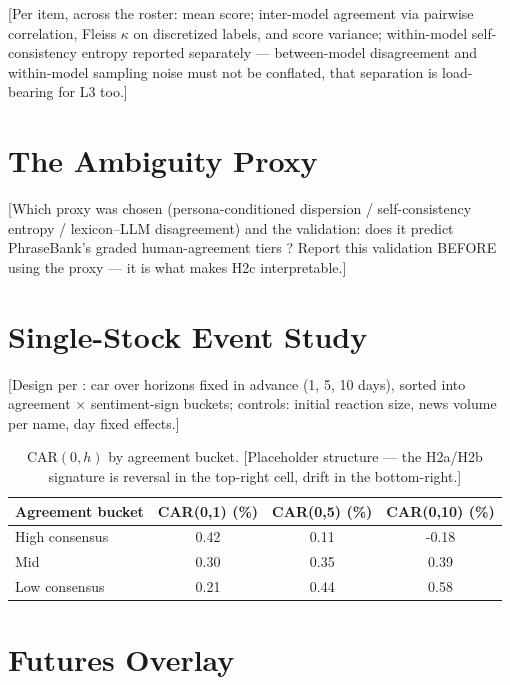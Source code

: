 [Per item, across the roster: mean score; inter-model agreement via
pairwise correlation, Fleiss $\kappa$ \parencite{fleiss1971kappa} on
discretized labels, and score variance; within-model self-consistency
entropy reported separately --- between-model disagreement and
within-model sampling noise must not be conflated, that separation is
load-bearing for L3 too.]

\section{The Ambiguity Proxy}
\label{sec:l2-ambiguity}

[Which proxy was chosen (persona-conditioned dispersion /
self-consistency entropy / lexicon--LLM disagreement) and the
validation: does it predict PhraseBank's graded human-agreement tiers
\parencite{malo2014phrasebank}? Report this validation BEFORE using
the proxy --- it is what makes H2c interpretable.]

\section{Single-Stock Event Study}
\label{sec:l2-event-study}

[Design per \textcite{mackinlay1997event}: \gls{car} over horizons
fixed in advance (1, 5, 10 days), sorted into agreement $\times$
sentiment-sign buckets; controls: initial reaction size, news volume
per name, day fixed effects.]

\begin{table}[htbp]
  \centering
  \caption{CAR$(0,h)$ by agreement bucket. [Placeholder structure ---
  the H2a/H2b signature is reversal in the top-right cell, drift in
  the bottom-right.]}
  \label{tab:l2-car}
  \begin{tabular}{@{}l S[table-format=-1.2] S[table-format=-1.2] S[table-format=-1.2]@{}}
    \toprule
    Agreement bucket & {CAR(0,1) (\%)} & {CAR(0,5) (\%)} & {CAR(0,10) (\%)} \\
    \midrule
    High consensus & 0.42 & 0.11 & -0.18 \\
    Mid            & 0.30 & 0.35 &  0.39 \\
    Low consensus  & 0.21 & 0.44 &  0.58 \\
    \bottomrule
  \end{tabular}
\end{table}

\section{Futures Overlay}
\label{sec:l2-overlay}

